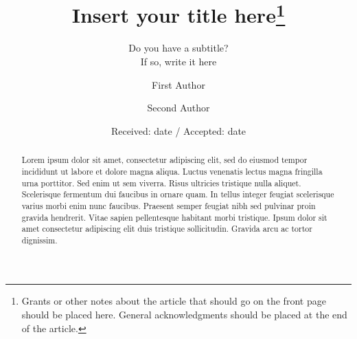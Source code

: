 \documentclass[natbib,table]{svjour3}                     %
\begin{document}
\title{Insert your title here\thanks{Grants or other notes
about the article that should go on the front page should be
placed here. General acknowledgments should be placed at the end of the article.}
}
\subtitle{Do you have a subtitle?\\ If so, write it here}


\author{First Author         \and
        Second Author %
}



\date{Received: date / Accepted: date}

\maketitle

\begin{abstract}
Lorem ipsum dolor sit amet, consectetur adipiscing elit, sed do eiusmod tempor incididunt ut labore et dolore magna aliqua.
Luctus venenatis lectus magna fringilla urna porttitor. Sed enim ut sem viverra.
Risus ultricies tristique nulla aliquet. Scelerisque fermentum dui faucibus in ornare quam.
In tellus integer feugiat scelerisque varius morbi enim nunc faucibus.
Praesent semper feugiat nibh sed pulvinar proin gravida hendrerit.
Vitae sapien pellentesque habitant morbi tristique.
Ipsum dolor sit amet consectetur adipiscing elit duis tristique sollicitudin.
Gravida arcu ac tortor dignissim.
\end{abstract}
\end{document}
